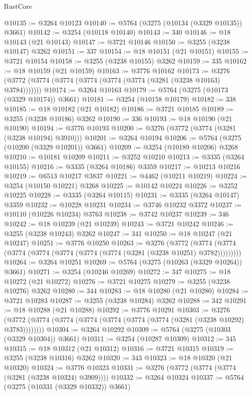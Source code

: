 \begin{lexlean}{RustCore}
\begin{coremodule}
@10135 := @3264 @10123
@10140 := @5764 (@3275 (@10134 (@3329 @10135)) @3661)
@10142 := @3254 (@10118 @10140)
@10143 := 340
@10146 := @18 @10143 (@21 @10143)
@10147 := @3721 @10146
@10150 := @3255 (@3238 @10147) @3262
@10151 := 337
@10154 := @18 @10151 (@21 @10151)
@10155 := @3721 @10154
@10158 := @3255 (@3238 @10155) @3262
@10159 := 335
@10162 := @18 @10159 (@21 @10159)
@10163 := @3776 @10162
@10173 := @3276 (@3772 (@3774 (@3774 (@3774 (@3774 (@3774 (@3281 (@3238 @10163) @3784)))))))
@10174 := @3264 @10163
@10179 := @5764 (@3275 (@10173 (@3329 @10174)) @3661)
@10181 := @3254 (@10158 @10179)
@10182 := 338
@10185 := @18 @10182 (@21 @10182)
@10186 := @3721 @10185
@10189 := @3255 (@3238 @10186) @3262
@10190 := 336
@10193 := @18 @10190 (@21 @10190)
@10194 := @3776 @10193
@10200 := @3276 (@3772 (@3774 (@3281 (@3238 @10194) @3910)))
@10201 := @3264 @10194
@10206 := @5764 (@3275 (@10200 (@3329 @10201)) @3661)
@10209 := @3254 (@10189 @10206) @3268
@10210 := @10181 @10209
@10211 := @3252 @10210
@10213 := @3335 (@3264 @10155)
@10216 := @3335 (@3264 @10186) @3359
@10217 := @10213 @10216
@10219 := @6513 @10217 @3837
@10221 := @4462 (@10211 @10219)
@10224 := @3254 (@10150 @10221) @3268
@10225 := @10142 @10224
@10226 := @3252 @10225
@10228 := @3335 (@3264 @10115)
@10231 := @3335 (@3264 @10147) @3359
@10232 := @10228 @10231
@10234 := @3746 @10232 @3372
@10237 := @10110 (@10226 @10234) @3763
@10238 := @3742 @10237
@10239 := 346
@10242 := @18 @10239 (@21 @10239)
@10243 := @3721 @10242
@10246 := @3255 (@3238 @10243) @3262
@10247 := 341
@10250 := @18 @10247 (@21 @10247)
@10251 := @3776 @10250
@10263 := @3276
    (@3772 (@3774 (@3774 (@3774 (@3774 (@3774 (@3774 (@3774 (@3281 (@3238 @10251) @3782)))))))))
@10264 := @3264 @10251
@10269 := @5764 (@3275 (@10263 (@3329 @10264)) @3661)
@10271 := @3254 (@10246 @10269)
@10272 := 347
@10275 := @18 @10272 (@21 @10272)
@10276 := @3721 @10275
@10279 := @3255 (@3238 @10276) @3262
@10280 := 344
@10283 := @18 @10280 (@21 @10280)
@10284 := @3721 @10283
@10287 := @3255 (@3238 @10284) @3262
@10288 := 342
@10291 := @18 @10288 (@21 @10288)
@10292 := @3776 @10291
@10303 := @3276 (@3772 (@3774 (@3774 (@3774 (@3774 (@3774 (@3774 (@3281 (@3238 @10292) @3783))))))))
@10304 := @3264 @10292
@10309 := @5764 (@3275 (@10303 (@3329 @10304)) @3661)
@10311 := @3254 (@10287 @10309)
@10312 := 345
@10315 := @18 @10312 (@21 @10312)
@10316 := @3721 @10315
@10319 := @3255 (@3238 @10316) @3262
@10320 := 343
@10323 := @18 @10320 (@21 @10320)
@10324 := @3776 @10323
@10331 := @3276 (@3772 (@3774 (@3774 (@3281 (@3238 @10324) @3909))))
@10332 := @3264 @10324
@10337 := @5764 (@3275 (@10331 (@3329 @10332)) @3661)

\end{coremodule}
\end{lexlean}
